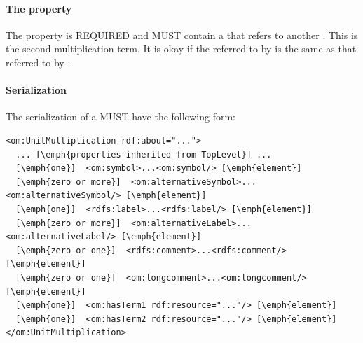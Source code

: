 \paragraph{The  property}\label{sec:hasTerm2}
The  property is REQUIRED and MUST contain a  that refers to another . This  is the second multiplication term. It is okay if the  referred to by  is the same as that referred to by .

\paragraph{Serialization}
The serialization of a  MUST have the following form:


\begin{lstlisting}
<om:UnitMultiplication rdf:about="...">
  ... [\emph{properties inherited from TopLevel}] ...
  [\emph{one}]  <om:symbol>...<om:symbol/> [\emph{element}]
  [\emph{zero or more}]  <om:alternativeSymbol>...<om:alternativeSymbol/> [\emph{element}]
  [\emph{one}]  <rdfs:label>...<rdfs:label/> [\emph{element}]
  [\emph{zero or more}]  <om:alternativeLabel>...<om:alternativeLabel/> [\emph{element}]
  [\emph{zero or one}]  <rdfs:comment>...<rdfs:comment/> [\emph{element}]
  [\emph{zero or one}]  <om:longcomment>...<om:longcomment/> [\emph{element}]
  [\emph{one}]  <om:hasTerm1 rdf:resource="..."/> [\emph{element}]
  [\emph{one}]  <om:hasTerm2 rdf:resource="..."/> [\emph{element}]
</om:UnitMultiplication>
\end{lstlisting}




